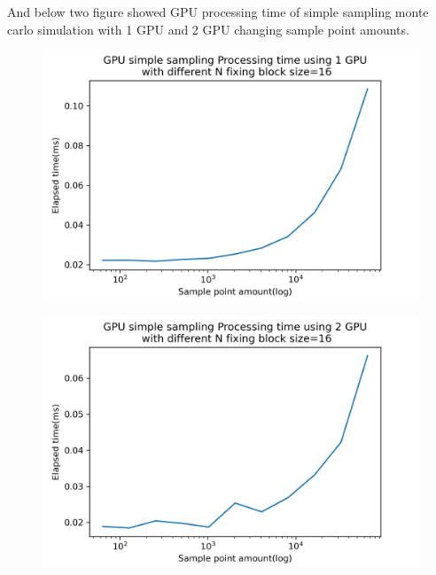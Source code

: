 \documentclass{article}
\begin{document}
	And below two figure showed GPU processing time of simple sampling monte carlo simulation with 1 GPU and 2 GPU changing sample point amounts.
	\begin{figure}[hb!]
		\centering
		\includegraphics[width=\linewidth]{notebook/1gpu_ss}
	\end{figure}
	\begin{figure}[hb!]
	\centering
	\includegraphics[width=\linewidth]{notebook/2gpu_ss}
	\end{figure}
\end{document}
